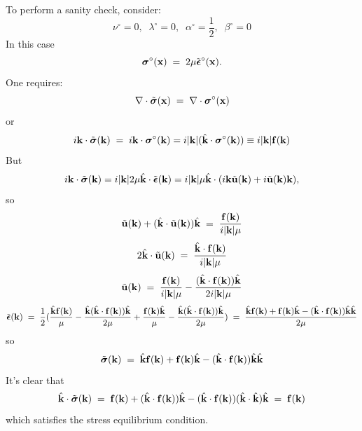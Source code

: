 \documentclass[12pt]{article}
\def\bmath#1{\mbox{\boldmath$#1$}}
\begin{document}
To perform a sanity check, consider:
\begin{equation}
 \nu^\circ = 0, \;\; \lambda^\circ = 0, \;\; \alpha^\circ = \frac{1}{2}, \;\; \beta^\circ = 0
\end{equation}
In this case
\begin{equation}
 \bmath{\sigma}^\circ({\bf x}) \;=\; 2\mu \tilde{\bmath{\epsilon}}^\circ({\bf x}).
\end{equation}
One requires:
\begin{equation}
 \nabla\cdot \tilde{\bmath{\sigma}}({\bf x}) \;=\; 
 \nabla\cdot \bmath{\sigma}^\circ({\bf x})
\end{equation}
or
\begin{equation}
 i{\bf k}\cdot \tilde{\bmath{\sigma}}({\bf k}) \;=\; 
 i{\bf k}\cdot \bmath{\sigma}^\circ({\bf k}) = 
i|{\bf k}| (\hat{\bf k}\cdot \bmath{\sigma}^\circ({\bf k})) 
\equiv i|{\bf k}| {\bf f}({\bf k})
 \label{SanityCheck1StressEquilibriumEquation}
\end{equation}
But 
\begin{equation}
 i{\bf k}\cdot \tilde{\bmath{\sigma}}({\bf k}) = i|{\bf k}| 2\mu \hat{\bf k}\cdot \tilde{\bmath{\epsilon}}({\bf k}) 
= i|{\bf k}|\mu\hat{\bf k}\cdot (i{\bf k}\tilde{\bf u}({\bf k})+ i\tilde{\bf u}({\bf k}){\bf k}),
\end{equation}
so 
\begin{equation}
 \tilde{\bf u}({\bf k}) + (\hat{\bf k}\cdot\tilde{\bf u}({\bf k}))\hat{\bf k} 
 \;=\; \frac{{\bf f}({\bf k})}{i|{\bf k}|\mu}
\end{equation}
\begin{equation}
 2\hat{\bf k}\cdot\tilde{\bf u}({\bf k})
 \;=\; \frac{\hat{\bf k}\cdot{\bf f}({\bf k})}{i|{\bf k}|\mu}
\end{equation}
\begin{equation}
 \tilde{\bf u}({\bf k}) 
 \;=\; \frac{{\bf f}({\bf k})}{i|{\bf k}|\mu} - 
  \frac{(\hat{\bf k}\cdot{\bf f}({\bf k}))\hat{\bf k}}{2i|{\bf k}|\mu}
\end{equation}
\begin{equation}
 \tilde{\bmath{\epsilon}}({\bf k}) 
 \;=\; \frac{1}{2}( 
\frac{\hat{\bf k}{\bf f}({\bf k})}{\mu} - 
  \frac{\hat{\bf k}(\hat{\bf k}\cdot{\bf f}({\bf k}))\hat{\bf k}}{2\mu}
+ \frac{{\bf f}({\bf k})\hat{\bf k}}{\mu} - 
  \frac{\hat{\bf k}(\hat{\bf k}\cdot{\bf f}({\bf k}))\hat{\bf k}}{2\mu}
) \;=\; \frac{\hat{\bf k}{\bf f}({\bf k}) + {\bf f}({\bf k})\hat{\bf k}
- (\hat{\bf k}\cdot{\bf f}({\bf k}))\hat{\bf k}\hat{\bf k}}{2\mu}
\end{equation}
so
\begin{equation}
 \tilde{\bmath{\sigma}}({\bf k}) 
 \;=\; \hat{\bf k}{\bf f}({\bf k}) + {\bf f}({\bf k})\hat{\bf k}
- (\hat{\bf k}\cdot{\bf f}({\bf k}))\hat{\bf k}\hat{\bf k}
\end{equation}
It's clear that 
\begin{equation}
 \hat{\bf k}\cdot \tilde{\bmath{\sigma}}({\bf k}) 
 \;=\; {\bf f}({\bf k}) + (\hat{\bf k}\cdot{\bf f}({\bf k}))\hat{\bf k}
- (\hat{\bf k}\cdot{\bf f}({\bf k}))(\hat{\bf k}\cdot\hat{\bf k})\hat{\bf k}
 \;=\; {\bf f}({\bf k})
\end{equation}
which satisfies the stress equilibrium condition.
\end{document}
